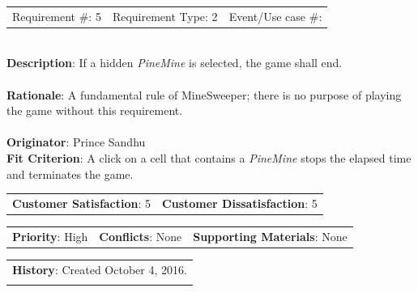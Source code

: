 \documentclass[12pt, titlepage]{article}
\begin{document}
\begin{reqbox}

\begin{tabular}{lll}
Requirement \#: 5 & Requirement Type: 2 & Event/Use case \#: \\
\end{tabular} \\

\textbf{Description}: If a hidden \textit{PineMine} is selected, the game shall end. \\ \\
\textbf{Rationale}: A fundamental rule of MineSweeper; there is no purpose of playing the game without this 			    requirement.\\ \\
\textbf{Originator}: Prince Sandhu \\
\textbf{Fit Criterion}: A click on a cell that contains a \textit{PineMine} stops the elapsed time and terminates the game. \\

\begin{tabular}{ll}
\textbf{Customer Satisfaction}: 5 & \textbf{Customer Dissatisfaction}: 5 \\
\end{tabular}

\begin{tabular}{lll}
\textbf{Priority}: High & \textbf{Conflicts}: None & \textbf{Supporting Materials}: None \\
\end{tabular}

\begin{tabular}{l}
\textbf{History}: Created October 4, 2016.\\ \\
\end{tabular} \\

\end{reqbox}
\end{document}
